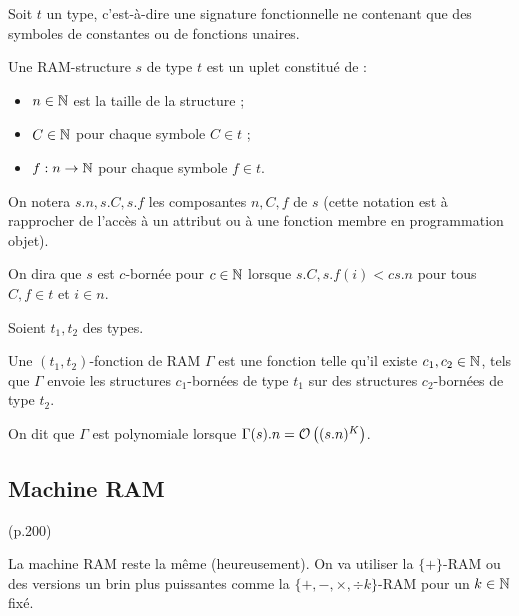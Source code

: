\documentclass{article}
\begin{document}
		\begin{definition}
			\label{def:RAM_data_structures}
			Soit $t$ un type, c'est-à-dire une signature fonctionnelle ne contenant que des symboles de constantes ou de fonctions unaires.
			
			Une RAM-structure $s$ de type $t$ est un uplet constitué de :
			\begin{itemize}[itemsep=-1mm]
				\item 	$n \in \mathbb{N}$ est la taille de la structure ;
				\item 	$C \in \mathbb{N}$ pour chaque symbole $C \in t$ ;
				\item 	$f : n \to \mathbb{N}$ pour chaque symbole $f \in t$.
			\end{itemize}
			
			On notera $s.n, s.C, s.f$ les composantes $n, C, f$ de $s$ (cette notation est à rapprocher de l'accès à un attribut ou à une fonction membre en programmation objet).
			
			On dira que $s$ est $c$-bornée pour $c\in\mathbb{N}$ lorsque $s.C, s.f(i) < c s.n$ pour tous $C, f \in t$ et $i \in n$.
		\end{definition}
	
	
		\begin{definition}
			\label{def:fonction_de_RAM}
			Soient $t_1, t_2$ des types. 
			
			Une $(t_1, t_2)$-fonction de RAM $\Gamma$ est une fonction telle qu'il existe $c_1, c_2 \in \mathbb{N}$, tels que $\Gamma$ envoie les structures $c_1$-bornées de type $t_1$ sur des structures $c_2$-bornées de type $t_2$\footnotemark.
			
			
			On dit que $\Gamma$ est polynomiale lorsque $\Gamma(s).n = \mathcal{O}\left( (s.n)^K \right)$.
			
		\end{definition}
	
	
	
		\subsection{Machine RAM} (p.200)
			\label{subsec:machine_RAM}
		
		La machine RAM reste la même (heureusement). On va utiliser la $\{+\}$-RAM ou des versions un brin plus puissantes comme la $\{+ , -, \times, \div k \}$-RAM pour un $k\in \mathbb{N}$ fixé\footnotemark. 
		
\end{document}
